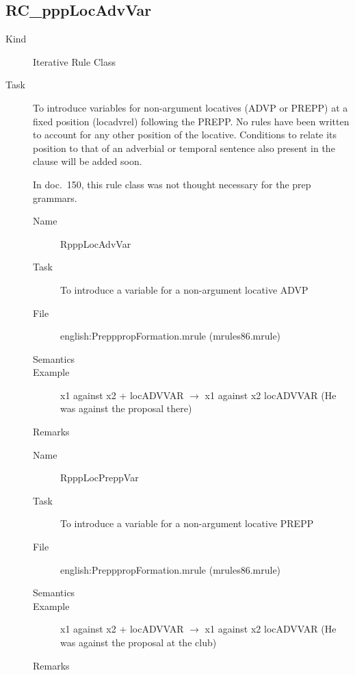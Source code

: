 \newpage
\subsection{RC\_pppLocAdvVar}
\begin{description}
\item[Kind] Iterative Rule Class
\item[Task] To introduce variables for non-argument locatives (ADVP or PREPP) 
at a fixed position (locadvrel) following the PREPP. No rules have been 
written to account for any other position 
of the locative. Conditions to relate its position to that of an adverbial or 
temporal sentence also present in the clause will be added soon.

In doc.\ 150, this rule class was not thought necessary for the prep grammars.

\vspace{1 cm}
\begin{description}
\item[Name] RpppLocAdvVar
\item[Task] To introduce a variable for a non-argument locative ADVP 
\item[File] english:PrepppropFormation.mrule (mrules86.mrule)
\item[Semantics]
\item[Example] x1 against x2 + locADVVAR $\rightarrow$ x1 against x2 locADVVAR
(He was against the proposal there)
\item[Remarks]
\end{description}

\vspace{1 cm}
\begin{description}
\item[Name] RpppLocPreppVar
\item[Task] To introduce a variable for a non-argument locative PREPP
\item[File] english:PrepppropFormation.mrule (mrules86.mrule)
\item[Semantics]
\item[Example] x1 against x2 + locADVVAR $\rightarrow$ x1 against x2 locADVVAR
(He was against the proposal at the club)
\item[Remarks]
\end{description}

\end{description}

\newpage
